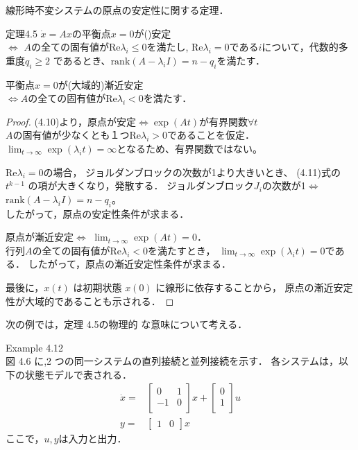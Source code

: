 \documentclass{jsarticle}
\begin{document}
{\color{gray}\hrulefill}

線形時不変システムの原点の安定性に関する定理．

\begin{itembox}[l]{定理4.5}
  $\dot x = Ax$の平衡点$x=0$が()安定\\
  $\Leftrightarrow$
  $A$の全ての固有値が$\text{Re}\lambda_i\leq 0$を満たし,
  $\text{Re}\lambda_i=0$である$i$について，代数的多重度$q_i\geq 2$
  であるとき、$\text{rank}(A-\lambda_i I) = n-q_i$を満たす．

  平衡点$x=0$が(大域的)漸近安定\\
  $\Leftrightarrow$$A$の全ての固有値が$\text{Re}\lambda_i< 0$を満たす．
\end{itembox}   

\begin{proof}
  (4.10)より，原点が安定$\Leftrightarrow$$\exp(At)$が有界関数$\forall t$\\
  $A$の固有値が少なくとも１つ$\text{Re}\lambda_i> 0$であることを仮定．
  $\lim_{t\rightarrow \infty}\exp(\lambda_it)=\infty$となるため、有界関数ではない。
  
  $\text{Re}\lambda_i= 0$の場合，
  ジョルダンブロックの次数が1より大きいとき、
  (4.11)式の $t^{k-1}$ の項が大きくなり，発散する．
  ジョルダンブロック$J_i$の次数が1$\Leftrightarrow$
  $\text{rank}(A - \lambda_i I) = n-q_i$。\\
  したがって，原点の安定性条件が求まる．

  原点が漸近安定$\Leftrightarrow$
  $\lim_{t \rightarrow \infty}\exp(At)=0$．\\
  行列$A$の全ての固有値が$\text{Re}\lambda_i< 0$を満たすとき，
  $\lim_{t\rightarrow \infty}\exp(\lambda_it)=0$である．
  したがって，原点の漸近安定性条件が求まる．
  
  最後に，$x(t)$ は初期状態 $x(0)$ に線形に依存することから，
  原点の漸近安定性が大域的であることも示される．
\end{proof}

{\color{gray}\hrulefill}

次の例では，定理 4.5の物理的
な意味について考える．

Example 4.12\\
図 4.6 に,2 つの同一システムの直列接続と並列接続を示す．
各システムは，以下の状態モデルで表される．
\begin{align*}
  \dot x = & \left[\begin{matrix}
    0 & 1 \\ -1 & 0\\
  \end{matrix}\right]x + 
  \left[
    \begin{matrix}
      0\\ 1\\
    \end{matrix}
  \right]u\\
  y = & \left[\begin{matrix}
    1& 0
  \end{matrix}\right]x
\end{align*}
ここで，$u,y$は入力と出力．
\end{document}
